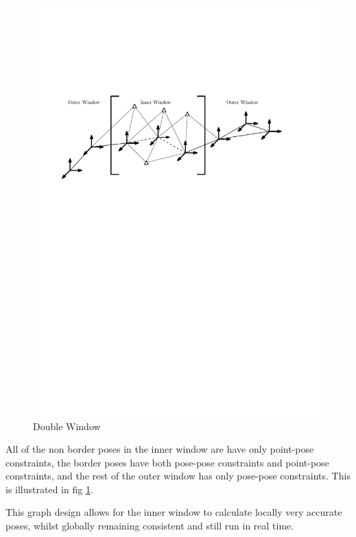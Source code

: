 \begin{figure}[h!]
  \centering
    \includegraphics[width=1.0\textwidth]{chapters/images/double_win}
  \caption{Double Window}
  \label{fig:double_window}
\end{figure}

All of the non border poses in the inner window are have only point-pose constraints, the border poses have both pose-pose constraints and point-pose constraints, and the rest of the outer window has only pose-pose constraints.  This is illustrated in fig \ref{fig:double_window}.  

This graph design allows for the inner window to calculate locally very accurate poses, whilst globally remaining consistent and still run in real time.

